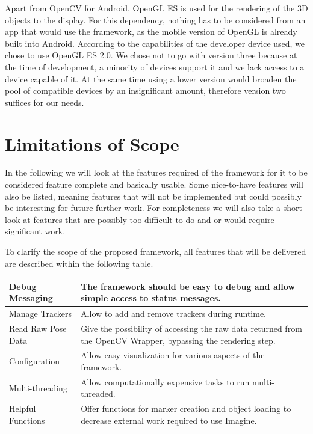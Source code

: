 Apart from OpenCV for Android, OpenGL ES is used for the rendering of the 3D objects to the display.
For this dependency, nothing has to be considered from an app that would use the framework, as the mobile version of OpenGL is already built into Android.
According to the capabilities of the developer device used, we chose to use OpenGL ES 2.0.
We chose not to go with version three because at the time of development, a minority of devices support it and we lack access to a device capable of it.
At the same time using a lower version would broaden the pool of compatible devices by an insignificant amount, therefore version two suffices for our needs.

\section{Limitations of Scope}
\label{scope_limit}

In the following we will look at the features required of the framework for it to be considered feature complete and basically usable.
Some nice-to-have features will also be listed, meaning features that will not be implemented but could possibly be interesting for future further work.
For completeness we will also take a short look at features that are possibly too difficult to do and or would require significant work.

To clarify the scope of the proposed framework, all features that will be delivered are described within the following table.

\begin{tabulary}{\textwidth}{L || L}
Debug Messaging & The framework should be easy to debug and allow simple access to status messages.\\
\hline
Manage Trackers & Allow to add and remove trackers during runtime.\\
\hline
Read Raw Pose Data & Give the possibility of accessing the raw data returned from the OpenCV Wrapper, bypassing the rendering step.\\
\hline
Configuration & Allow easy visualization for various aspects of the framework.\\
\hline
Multi-threading & Allow computationally expensive tasks to run multi-threaded.\\
\hline
Helpful Functions & Offer functions for marker creation and object loading to decrease external work required to use Imagine.\\
\end{tabulary}


